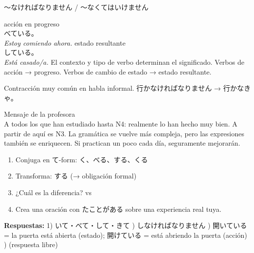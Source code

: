   {〜なければなりません / 〜なくてはいけません}
  {
   }

  {acción en progreso\\\small{}べている。\\\textit{Estoy comiendo ahora.}}
  {estado resultante\\\small{}している。\\\textit{Está casado/a.}}
  {El contexto y tipo de verbo determinan el significado. Verbos de acción → progreso. Verbos de cambio de estado → estado resultante.}

  {Contracción muy común en habla informal. 行かなければなりません → 行かなきゃ。}


{Mensaje de la profesora\\[0.4em]
  A todos los que han estudiado hasta N4: realmente lo han hecho muy bien. A partir de aquí es N3. La gramática se vuelve más compleja, pero las expresiones también se enriquecen. Si practican un poco cada día, seguramente mejorarán.}

\begin{tcolorbox}[ejerciciobox, title={\emoji{pencil} Ejercicios de Repaso}]
\begin{enumerate}
  \item Conjuga en て-form: く、べる、する、くる
  \item Transforma: する (→ obligación formal)
  \item ¿Cuál es la diferencia?  vs 
  \item Crea una oración con たことがある sobre una experiencia real tuya.
\end{enumerate}
\vspace{0.4em}
\textbf{Respuestas:}
1) いて・べて・して・きて ) しなければなりません ) 開いている = la puerta está abierta (estado); 開けている = está abriendo la puerta (acción) ) (respuesta libre)
\end{tcolorbox}

